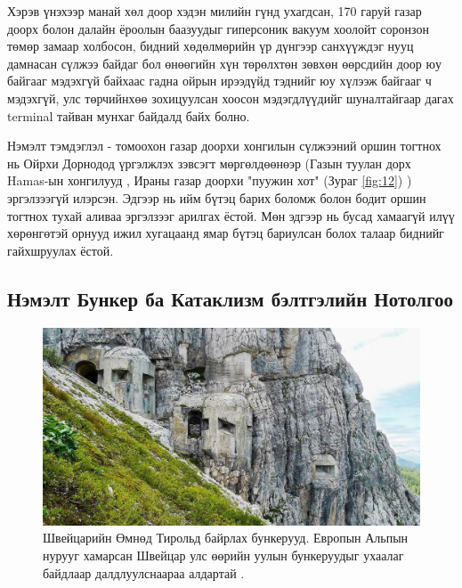 \documentclass[10pt,twocolumn,letterpaper]{article}
\begin{document}
Хэрэв үнэхээр манай хөл доор хэдэн милийн гүнд ухагдсан, 170 гаруй газар доорх болон далайн ёроолын баазуудыг гиперсоник вакуум хоолойт соронзон төмөр замаар холбосон, бидний хөдөлмөрийн үр дүнгээр санхүүждэг нууц дамнасан сүлжээ байдаг бол өнөөгийн хүн төрөлхтөн зөвхөн өөрсдийн доор юу байгааг мэдэхгүй байхаас гадна ойрын ирээдүйд тэднийг юу хүлээж байгааг ч мэдэхгүй, улс төрчийнхөө зохицуулсан хоосон мэдэгдлүүдийг шуналтайгаар дагах terminal тайван мунхаг байдалд байх болно.

Нэмэлт тэмдэглэл - томоохон газар доорхи хонгилын сүлжээний оршин тогтнох нь Ойрхи Дорнодод үргэлжлэх зэвсэгт мөргөлдөөнөэр (Газын туулан дорх Hamas-ын хонгилууд \cite{38}, Ираны газар доорхи "пуужин хот" (Зураг \ref{fig:12}) \cite{39,40}) эргэлзээгүй илэрсэн. Эдгээр нь ийм бүтэц барих боломж болон бодит оршин тогтнох тухай аливаа эргэлзээг арилгах ёстой. Мөн эдгээр нь бусад хамаагүй илүү хөрөнгөтэй орнууд ижил хугацаанд ямар бүтэц бариулсан болох талаар биднийг гайхшруулах ёстой.
\subsection{Нэмэлт Бункер ба Катаклизм бэлтгэлийн Нотолгоо}

\begin{figure}[t]
\begin{center}
\includegraphics[width=1\linewidth]{tyrol.jpg}
\end{center}
   \caption{Швейцарийн Өмнөд Тирольд байрлах бункерууд. Европын Альпын нурууг хамарсан Швейцар улс өөрийн уулын бункеруудыг ухаалаг байдлаар далдлуулснаараа алдартай \cite{32}.}
\label{fig:7}
\label{fig:onecol}
\end{figure}
\end{document}
